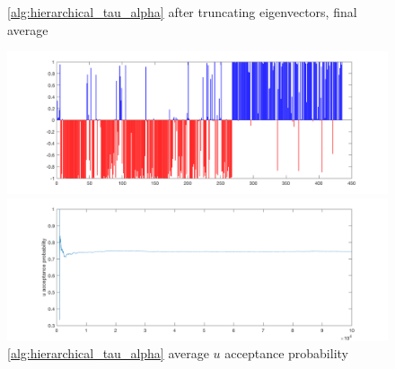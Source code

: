 \documentclass{siamart1116}
\begin{document}
\begin{figure}[!htb]
\begin{minipage}{0.48\textwidth}
    \caption{\label{fig:centered_voting_avg} \cref{alg:hierarchical_tau_alpha} after truncating eigenvectors, final average}
    \includegraphics[width=\linewidth]{voting/centered/final_avg.png}
\end{minipage}\hfill
\begin{minipage}{0.48\textwidth}
    \caption{\label{fig:centered_voting_accept} \cref{alg:hierarchical_tau_alpha} average $u$ acceptance probability}
    \includegraphics[width=\linewidth]{voting/centered/acceptance_u_probability.png}
\end{minipage}
\end{figure}
\end{document}
